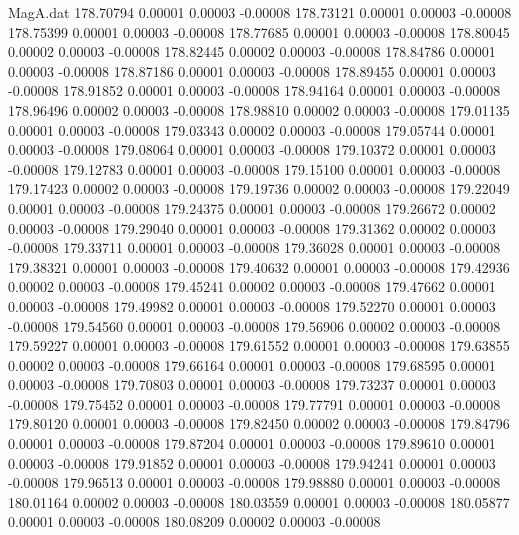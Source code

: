\begin{filecontents}{MagA.dat}
 178.70794    0.00001    0.00003   -0.00008
 178.73121    0.00001    0.00003   -0.00008
 178.75399    0.00001    0.00003   -0.00008
 178.77685    0.00001    0.00003   -0.00008
 178.80045    0.00002    0.00003   -0.00008
 178.82445    0.00002    0.00003   -0.00008
 178.84786    0.00001    0.00003   -0.00008
 178.87186    0.00001    0.00003   -0.00008
 178.89455    0.00001    0.00003   -0.00008
 178.91852    0.00001    0.00003   -0.00008
 178.94164    0.00001    0.00003   -0.00008
 178.96496    0.00002    0.00003   -0.00008
 178.98810    0.00002    0.00003   -0.00008
 179.01135    0.00001    0.00003   -0.00008
 179.03343    0.00002    0.00003   -0.00008
 179.05744    0.00001    0.00003   -0.00008
 179.08064    0.00001    0.00003   -0.00008
 179.10372    0.00001    0.00003   -0.00008
 179.12783    0.00001    0.00003   -0.00008
 179.15100    0.00001    0.00003   -0.00008
 179.17423    0.00002    0.00003   -0.00008
 179.19736    0.00002    0.00003   -0.00008
 179.22049    0.00001    0.00003   -0.00008
 179.24375    0.00001    0.00003   -0.00008
 179.26672    0.00002    0.00003   -0.00008
 179.29040    0.00001    0.00003   -0.00008
 179.31362    0.00002    0.00003   -0.00008
 179.33711    0.00001    0.00003   -0.00008
 179.36028    0.00001    0.00003   -0.00008
 179.38321    0.00001    0.00003   -0.00008
 179.40632    0.00001    0.00003   -0.00008
 179.42936    0.00002    0.00003   -0.00008
 179.45241    0.00002    0.00003   -0.00008
 179.47662    0.00001    0.00003   -0.00008
 179.49982    0.00001    0.00003   -0.00008
 179.52270    0.00001    0.00003   -0.00008
 179.54560    0.00001    0.00003   -0.00008
 179.56906    0.00002    0.00003   -0.00008
 179.59227    0.00001    0.00003   -0.00008
 179.61552    0.00001    0.00003   -0.00008
 179.63855    0.00002    0.00003   -0.00008
 179.66164    0.00001    0.00003   -0.00008
 179.68595    0.00001    0.00003   -0.00008
 179.70803    0.00001    0.00003   -0.00008
 179.73237    0.00001    0.00003   -0.00008
 179.75452    0.00001    0.00003   -0.00008
 179.77791    0.00001    0.00003   -0.00008
 179.80120    0.00001    0.00003   -0.00008
 179.82450    0.00002    0.00003   -0.00008
 179.84796    0.00001    0.00003   -0.00008
 179.87204    0.00001    0.00003   -0.00008
 179.89610    0.00001    0.00003   -0.00008
 179.91852    0.00001    0.00003   -0.00008
 179.94241    0.00001    0.00003   -0.00008
 179.96513    0.00001    0.00003   -0.00008
 179.98880    0.00001    0.00003   -0.00008
 180.01164    0.00002    0.00003   -0.00008
 180.03559    0.00001    0.00003   -0.00008
 180.05877    0.00001    0.00003   -0.00008
 180.08209    0.00002    0.00003   -0.00008

\end{filecontents}
